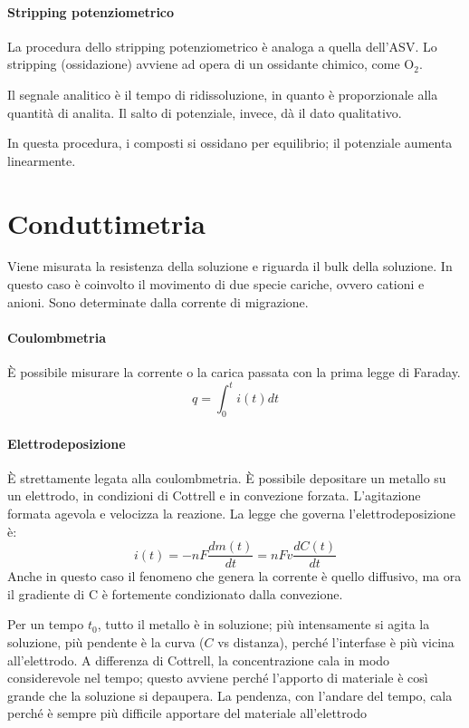 \paragraph{Stripping potenziometrico}
La procedura dello stripping potenziometrico è analoga a quella dell'ASV.
Lo stripping (ossidazione) avviene ad opera di un ossidante chimico, come O$_2$.


Il segnale analitico è il tempo di ridissoluzione, in quanto è proporzionale alla quantità di analita.
Il salto di potenziale, invece, dà il dato qualitativo.

In questa procedura, i composti si ossidano per equilibrio; il potenziale aumenta linearmente.

\section{Conduttimetria}
Viene misurata la resistenza della soluzione e riguarda il bulk della soluzione.
In questo caso è coinvolto il movimento di due specie cariche, ovvero cationi e anioni.
Sono determinate dalla corrente di migrazione.

\paragraph{Coulombmetria}
È possibile misurare la corrente o la carica passata con la prima legge di Faraday.
\[
q = \int_0^t i(t) dt
\]

\paragraph{Elettrodeposizione}
È strettamente legata alla coulombmetria.
È possibile depositare un metallo su un elettrodo, in condizioni di Cottrell e in convezione forzata.
L'agitazione formata agevola e velocizza la reazione.
La legge che governa l'elettrodeposizione è:
\[
i(t) = - n F \frac{dm (t)}{dt} = nFv \frac{d C(t)}{dt}
\]
Anche in questo caso il fenomeno che genera la corrente è quello diffusivo, ma ora il gradiente di C è fortemente condizionato dalla convezione.


Per un tempo $t_0$, tutto il metallo è in soluzione; più intensamente si agita la soluzione, più pendente è la curva ($C$ vs $\text{distanza}$), perché l'interfase è più vicina all'elettrodo.
A differenza di Cottrell, la concentrazione cala in modo considerevole nel tempo; questo avviene perché l'apporto di materiale è così grande che la soluzione si depaupera.
La pendenza, con l'andare del tempo, cala perché è sempre più difficile apportare del materiale all'elettrodo

